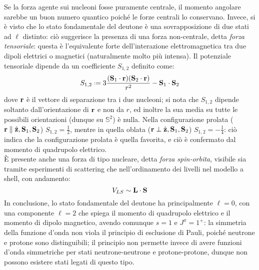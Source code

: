 Se la forza agente sui nucleoni fosse puramente centrale, il momento angolare sarebbe un buon numero quantico poiché le forze centrali lo conservano. Invece, si è visto che lo stato fondamentale del deutone è una sovrapposizione di due stati ad $ \ell $ distinto: ciò suggerisce la presenza di una forza non-centrale, detta \textit{forza tensoriale}: questa è l'equivalente forte dell'interazione elettromagnetica tra due dipoli elettrici o magnetici (naturalmente molto più intensa). Il potenziale tensoriale dipende da un coefficiente $ S_{1,2} $ definito come:
\begin{equation}
	S_{1,2} \defeq 3 \frac{(\ve{S}_1 \cdot \ve{r}) (\ve{S}_2 \cdot \ve{r})}{r^2} - \ve{S}_1 \cdot \ve{S}_2
	\label{eq:4.19}
\end{equation}
dove $ \mathbf{r} $ è il vettore di separazione tra i due nucleoni; si nota che $ S_{1,2} $ dipende soltanto dall'orientazione di $ \mathbf{r} $ e non da $ r $, ed inoltre la sua media su tutte le possibili orientazioni (dunque su $ \mathbb{S}^2 $) è nulla. Nella configurazione prolata ($ \mathbf{r} \parallel \hat{\mathbf{z}},\mathbf{S}_1,\mathbf{S}_2 $) $ S_{1,2} = \frac{1}{2} $, mentre in quella oblata ($ \mathbf{r} \perp \hat{\mathbf{z}},\mathbf{S}_1,\mathbf{S}_2 $) $ S_{1,2} = - \frac{1}{4} $: ciò indica che la configurazione prolata è quella favorita, e ciò è confermato dal momento di quadrupolo elettrico.\\
È presente anche una forza di tipo nucleare, detta \textit{forza spin-orbita}, visibile sia tramite esperimenti di scattering che nell'ordinamento dei livelli nel modello a shell, con andamento:
\begin{equation}
	V_{LS} \sim \mathbf{L} \cdot \mathbf{S}
	\label{eq:4.20}
\end{equation}
In conclusione, lo stato fondamentale del deutone ha principalmente $ \ell = 0 $, con una componente $ \ell = 2 $ che spiega il momento di quadrupolo elettrico e il momento di dipolo magnetico, avendo comunque $ s = 1 $ e $ J^{\pi} = 1^+ $: la simmetria della funzione d'onda non viola il principio di esclusione di Pauli, poiché neutrone e protone sono distinguibili; il principio non permette invece di avere funzioni d'onda simmetriche per stati neutrone-neutrone e protone-protone, dunque non possono esistere stati legati di questo tipo.

